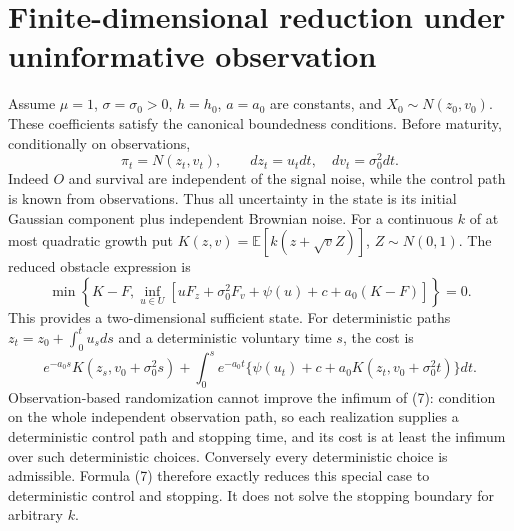 \documentclass[11pt]{article}
\theoremstyle{definition}
\begin{document}
\section*{Finite-dimensional reduction under uninformative observation}
Assume $\mu=1$, $\sigma=\sigma_0>0$, $h=h_0$, $a=a_0$ are constants,
and $X_0\sim N(z_0,v_0)$. These coefficients satisfy the canonical
boundedness conditions. Before maturity, conditionally on observations,
\[
 \pi_t=N(z_t,v_t),\qquad dz_t=u_tdt,\quad dv_t=\sigma_0^2dt.       \tag{5}
\]
Indeed $O$ and survival are independent of the signal noise, while the
control path is known from observations. Thus all uncertainty in the
state is its initial Gaussian component plus independent Brownian noise.
For a continuous $k$ of at most quadratic growth put
$K(z,v)=\mathbb E[k(z+\sqrt v Z)]$, $Z\sim N(0,1)$.
The reduced obstacle expression is
\[
 \min\left\{K-F,\inf_{u\in U}
  [uF_z+\sigma_0^2F_v+\psi(u)+c+a_0(K-F)]\right\}=0.     \tag{6}
\]
This provides a two-dimensional sufficient state. For deterministic paths
$z_t=z_0+\int_0^t u_sds$ and a deterministic voluntary time $s$, the cost is
\[
 e^{-a_0s}K(z_s,v_0+\sigma_0^2s)
 +\int_0^s e^{-a_0t}\{\psi(u_t)+c+a_0K(z_t,v_0+\sigma_0^2t)\}dt.  \tag{7}
\]
Observation-based randomization cannot improve the infimum of (7): condition
on the whole independent observation path, so each realization supplies a
deterministic control path and stopping time, and its cost is at least
the infimum over such deterministic choices. Conversely every deterministic
choice is admissible. Formula (7) therefore exactly reduces this special
case to deterministic control and stopping. It does not solve the stopping
boundary for arbitrary $k$.
\end{document}
